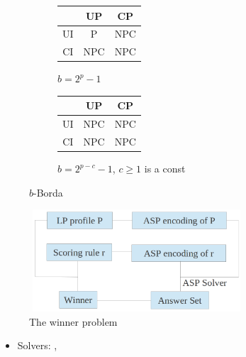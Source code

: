 {
	\begin{figure}
		\centering
    \begin{subfigure}[b]{0.45\textwidth}
			\centering
		  \begin{tabular}[0.45\textwidth]{ | c | c | c | }
		    \hline
		      & UP & CP \\
		    \hline
		    UI & P & NPC \\
		    \hline
		    CI & NPC & NPC \\
		    \hline
		  \end{tabular}
			\caption{$b = 2^p-1$}
		\end{subfigure}
    \begin{subfigure}[b]{0.45\textwidth}
			\centering
		  \begin{tabular}[0.45\textwidth]{ | c | c | c | }
		    \hline
		      & UP & CP \\
		    \hline
		    UI & NPC & NPC \\
		    \hline
		    CI & NPC & NPC \\
		    \hline
		  \end{tabular}
			\caption{\footnotesize $b = 2^{p-c}-1$, $c\geq 1$ is a const}
		\end{subfigure}
		\caption{$b$-Borda}
	\end{figure}
}

{
	\begin{figure}
		\centering
		\includegraphics[width=8cm,height=3.8cm]{figs/LPTrees/asp_win_struct.png}
		\caption{The winner problem}
	\end{figure}

	\vspace{-0.45cm}

	\begin{itemize}
		\item Solvers: , 
	\end{itemize}
}

